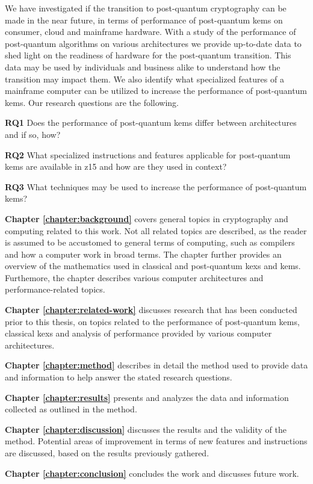 We have investigated if the transition to \gls{post-quantum} cryptography can be made in the near future, in terms of performance of \gls{post-quantum} \glspl{kem} on consumer, cloud and mainframe hardware. With a study of the performance of \gls{post-quantum} algorithms on various architectures we provide up-to-date data to shed light on the readiness of hardware for the \gls{post-quantum} transition. This data may be used by individuals and business alike to understand how the transition may impact them. We also identify what specialized features of a mainframe computer can be utilized to increase the performance of \gls{post-quantum} \glspl{kem}. Our research questions are the following.

\noindent\textbf{RQ1} Does the performance of \gls{post-quantum} \glspl{kem} differ between architectures and if so, how?\label{rq1}\hfill\par
\noindent\textbf{RQ2} What specialized instructions and features applicable for \gls{post-quantum} \glspl{kem} are available in \gls{z15} and how are they used in context?\label{rq2}\hfill\par
\noindent\textbf{RQ3} What techniques may be used to increase the performance of \gls{post-quantum} \glspl{kem}?\label{rq3}\hfill\par



\noindent\textbf{Chapter \ref{chapter:background}} covers general topics in cryptography and computing related to this work. Not all related topics are described, as the reader is assumed to be accustomed to general terms of computing, such as compilers and how a computer work in broad terms. The chapter further provides an overview of the mathematics used in classical and \gls{post-quantum} \glspl{kex} and \glspl{kem}. Furthemore, the chapter describes various computer architectures and performance-related topics.

\noindent\textbf{Chapter \ref{chapter:related-work}} discusses research that has been conducted prior to this thesis, on topics related to the performance of \gls{post-quantum} \glspl{kem}, classical \glspl{kex} and analysis of performance provided by various computer architectures.

\noindent\textbf{Chapter \ref{chapter:method}} describes in detail the method used to provide data and information to help answer the stated research questions.

\noindent\textbf{Chapter \ref{chapter:results}} presents and analyzes the data and information collected as outlined in the method.

\noindent\textbf{Chapter \ref{chapter:discussion}} discusses the results and the validity of the method. Potential areas of improvement in terms of new features and instructions are discussed, based on the results previously gathered.

\noindent\textbf{Chapter \ref{chapter:conclusion}} concludes the work and discusses future work.